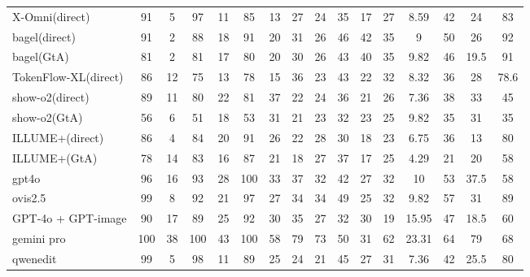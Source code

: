 \documentclass{article}
\theoremstyle{plain}
\theoremstyle{definition}
\theoremstyle{remark}
\begin{document}
\begin{table}[!htbp]
{\begin{tabular}{@{}lccccccccccccccc@{}}
X-Omni(direct) & 91 & 5 & 97 & 11 & 85 & 13 & 27 & 24 & 35 & 17 & 27 & 8.59 & 42 & 24 & 83 \\
bagel(direct) & 91 & 2 & 88 & 18 & 91 & 20 & 31 & 26 & 46 & 42 & 35 & 9 & 50 & 26 & 92 \\
bagel(GtA) & 81 & 2 & 81 & 17 & 80 & 20 & 30 & 26 & 43 & 40 & 35 & 9.82 & 46 & 19.5 & 91 \\
TokenFlow-XL(direct) & 86 & 12 & 75 & 13 & 78 & 15 & 36 & 23 & 43 & 22 & 32 & 8.32 & 36 & 28 & 78.6 \\
show-o2(direct) & 89 & 11 & 80 & 22 & 81 & 37 & 22 & 24 & 36 & 21 & 26 & 7.36 & 38 & 33 & 45 \\
show-o2(GtA) & 56 & 6 & 51 & 18 & 53 & 31 & 21 & 23 & 32 & 23 & 25 & 9.82 & 35 & 31 & 35 \\
ILLUME+(direct) & 86 & 4 & 84 & 20 & 91 & 26 & 22 & 28 & 30 & 18 & 23 & 6.75 & 36 & 13 & 80 \\
ILLUME+(GtA) & 78 & 14 & 83 & 16 & 87 & 21 & 18 & 27 & 37 & 17 & 25 & 4.29 & 21 & 20 & 58 \\
\midrule
\rowcolor{orange!8}
gpt4o & 96 & 16 & 93 & 28 & 100 & 33 & 37 & 32 & 42 & 27 & 32 & 10 & 53 & 37.5 & 58 \\
ovis2.5 & 99 & 8 & 92 & 21 & 97 & 27 & 34 & 34 & 49 & 25 & 32 & 9.82 & 57 & 31 & 89 \\
\midrule
GPT-4o + GPT-image & 90 & 17 & 89 & 25 & 92 & 30 & 35 & 27 & 32 & 30 & 19 & 15.95 & 47 & 18.5 & 60 \\
gemini pro & 100 & 38 & 100 & 43 & 100 & 58 & 79 & 73 & 50 & 31 & 62 & 23.31 & 64 & 79 & 68 \\
qwenedit & 99 & 5 & 98 & 11 & 89 & 25 & 24 & 21 & 45 & 27 & 31 & 7.36 & 42 & 25.5 & 80 \\
\bottomrule
\end{tabular}%
}
\end{table}
\end{document}
